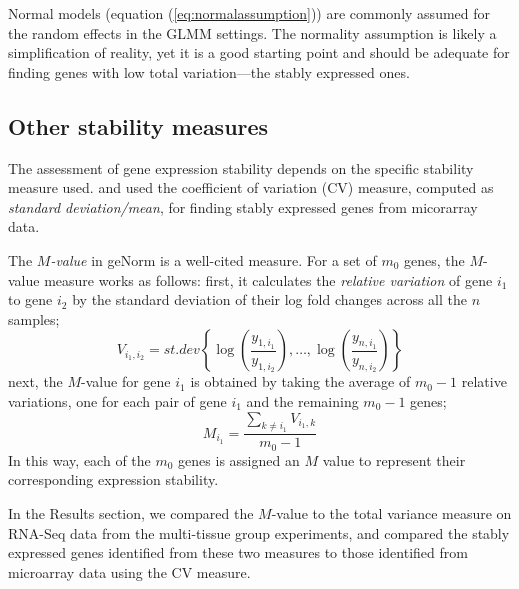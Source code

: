 \documentclass[letterpaper,12pt]{article}
\begin{document}
Normal models (equation (\ref{eq:normalassumption})) are commonly assumed for
the random effects in the GLMM settings. The normality assumption is likely a
simplification of reality, yet it is a good starting point and should be
adequate for finding genes with low total variation---the stably expressed
ones.

\subsection{Other stability measures}\label{subsection:OtherStabilityMeasure}
The assessment of gene expression stability depends on the specific stability
measure used. 
\cite{czechowski2005genome} and \cite{dekkers2012identification} used  the
coefficient of variation (CV) measure, computed as \textit{standard
deviation/mean}, for finding stably expressed genes from micorarray data.


The \textit{$M$-value} in geNorm \citep{vandesompele2002accurate} is a
well-cited measure. For a set of $m_0$ genes, the $M$-value measure works as
follows: first, it calculates the \textit{relative variation} of gene $i_1$ to
gene $i_2$ by the standard deviation of their log fold changes
across all the $n$ samples; 
 	\[V_{i_1, i_2} =\textit{st.dev} \left\{\log\left(\dfrac{y_{1,i_1}}{y_{1, i_2}}\right),\ldots, \log\left(\dfrac{y_{n, i_1}}{y_{n, i_2}}\right) \right\}\]
 next, the $M$-value for gene 
 $i_1$ is obtained by taking the average of $m_0-1$ relative variations, one
for each pair of gene $i_1$ and the remaining $m_0-1$ genes;
\[M_{i_1} = \frac{\sum_{k\neq i_1}V_{i_1, k}}{m_0-1}\] 
In this way,  each of the $m_0$ genes is assigned an $M$ value to represent their corresponding expression stability. 
			

In the Results section, we compared the $M$-value to the total variance measure
on RNA-Seq data from the multi-tissue group experiments, and compared the
stably expressed genes identified from these two measures to those identified
from microarray data using the CV measure.

%
%
	
\end{document}
